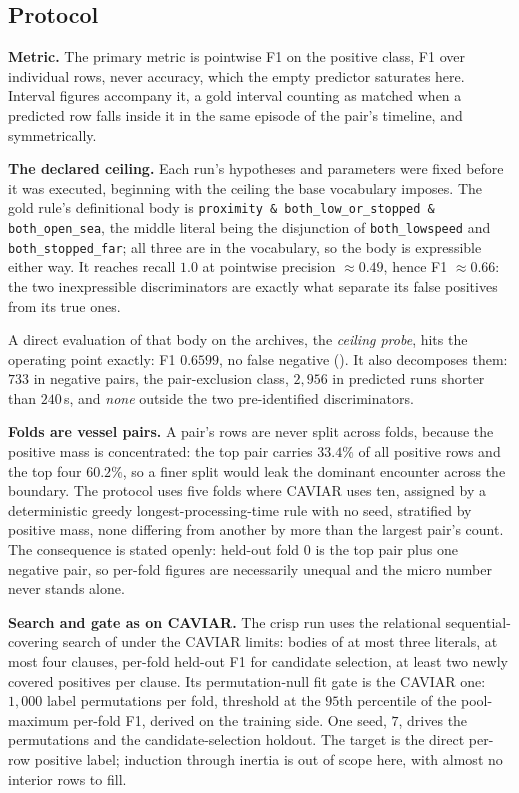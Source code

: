 \subsection{Protocol}

\textbf{Metric.} The primary metric is pointwise F1 on the positive class, F1 over individual rows, never accuracy, which the empty predictor saturates here. Interval figures accompany it, a gold interval counting as matched when a predicted row falls inside it in the same episode of the pair's timeline, and symmetrically.

\textbf{The declared ceiling.} Each run's hypotheses and parameters were fixed before it was executed, beginning with the ceiling the base vocabulary imposes. The gold rule's definitional body is \texttt{proximity \& both\_low\_or\_stopped \& both\_open\_sea}, the middle literal being the disjunction of \texttt{both\_lowspeed} and \texttt{both\_stopped\_far}; all three are in the vocabulary, so the body is expressible either way. It reaches recall $1.0$ at pointwise precision ${\approx}0.49$, hence F1 ${\approx}0.66$: the two inexpressible discriminators are exactly what separate its false positives from its true ones.

A direct evaluation of that body on the archives, the \emph{ceiling probe}, hits the operating point exactly: F1 $0.6599$, no false negative (). It also decomposes them: $733$ in negative pairs, the pair-exclusion class, $2{,}956$ in predicted runs shorter than $240$\,s, and \emph{none} outside the two pre-identified discriminators.

\textbf{Folds are vessel pairs.} A pair's rows are never split across folds, because the positive mass is concentrated: the top pair carries $33.4\%$ of all positive rows and the top four $60.2\%$, so a finer split would leak the dominant encounter across the boundary. The protocol uses five folds where CAVIAR uses ten, assigned by a deterministic greedy longest-processing-time rule with no seed, stratified by positive mass, none differing from another by more than the largest pair's count. The consequence is stated openly: held-out fold 0 is the top pair plus one negative pair, so per-fold figures are necessarily unequal and the micro number never stands alone.

\textbf{Search and gate as on CAVIAR.} The crisp run uses the relational sequential-covering search of  under the CAVIAR limits: bodies of at most three literals, at most four clauses, per-fold held-out F1 for candidate selection, at least two newly covered positives per clause. Its permutation-null fit gate is the CAVIAR one: $1{,}000$ label permutations per fold, threshold at the $95$th percentile of the pool-maximum per-fold F1, derived on the training side. One seed, $7$, drives the permutations and the candidate-selection holdout. The target is the direct per-row positive label; induction through inertia is out of scope here, with almost no interior rows to fill.

